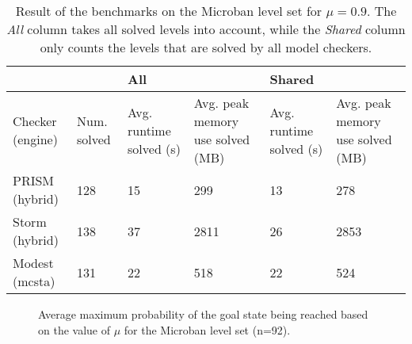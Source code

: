\begin{table*}[ht]
\begin{tabularx}{\textwidth}{XX|XX|XX|}
\cline{3-6}
                                       &             & \multicolumn{2}{l|}{All}                                                   & \multicolumn{2}{l|}{Shared}                                                \\ \hline
\multicolumn{1}{|l|}{Checker (engine)} & Num. solved & \multicolumn{1}{l|}{Avg. runtime solved (s)} & Avg. peak memory use solved (MB) & \multicolumn{1}{l|}{Avg. runtime solved (s)} & Avg. peak memory use solved (MB) \\ \hline
\multicolumn{1}{|l|}{PRISM (hybrid)}   & 128         & \multicolumn{1}{l|}{15}                      & 299                         & \multicolumn{1}{l|}{13}                      & 278                         \\ \hline
\multicolumn{1}{|l|}{Storm (hybrid)}   & 138         & \multicolumn{1}{l|}{37}                      & 2811                        & \multicolumn{1}{l|}{26}                      & 2853                        \\ \hline
\multicolumn{1}{|l|}{Modest (mcsta)}   & 131         & \multicolumn{1}{l|}{22}                      & 518                         & \multicolumn{1}{l|}{22}                      & 524                         \\ \hline
\end{tabularx}
\caption{Result of the benchmarks on the Microban level set for $\mu=0.9$. The \textit{All} column takes all solved levels into account, while the \textit{Shared} column only counts the levels that are solved by all model checkers.}
\label{tab:benchmark_mu_0.9}
\end{table*}

\begin{figure}[h]
    \centering
    \caption{Average maximum probability of the goal state being reached based on the value of $\mu$ for the Microban level set (n=92).}
    \label{fig:chart_goal_reached}
\end{figure}

